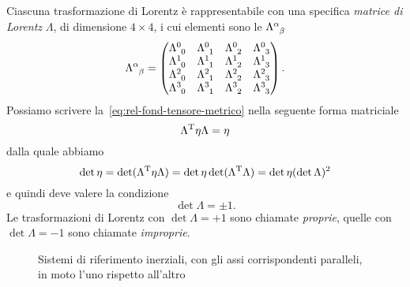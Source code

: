 Ciascuna trasformazione di Lorentz è rappresentabile con una specifica
\emph{matrice di Lorentz} $\Lambda$, di dimensione $4 \times 4$, i cui elementi
sono le $\tensor{\Lambda}{^{\alpha}_{\beta}}$
\begin{equation}
  \tensor{\Lambda}{^{\alpha}_{\beta}} =
  \begin{pmatrix}
    \tensor{\Lambda}{^{0}_{0}} & \tensor{\Lambda}{^{0}_{1}} &
    \tensor{\Lambda}{^{0}_{2}} & \tensor{\Lambda}{^{0}_{3}} \\
    \tensor{\Lambda}{^{1}_{0}} & \tensor{\Lambda}{^{1}_{1}} &
    \tensor{\Lambda}{^{1}_{2}} & \tensor{\Lambda}{^{1}_{3}} \\
    \tensor{\Lambda}{^{2}_{0}} & \tensor{\Lambda}{^{2}_{1}} &
    \tensor{\Lambda}{^{2}_{2}} & \tensor{\Lambda}{^{2}_{3}} \\
    \tensor{\Lambda}{^{3}_{0}} & \tensor{\Lambda}{^{3}_{1}} &
    \tensor{\Lambda}{^{3}_{2}} & \tensor{\Lambda}{^{3}_{3}}
  \end{pmatrix}.
\end{equation}
Possiamo scrivere la~\eqref{eq:rel-fond-tensore-metrico} nella seguente forma
matriciale
\begin{equation}
  \Lambda^{\textup{T}}\eta\Lambda = \eta
\end{equation}
dalla quale abbiamo
\begin{equation}
  \det\eta = \det(\Lambda^{\textup{T}}\eta\Lambda) = \det\eta
  \det(\Lambda^{\textup{T}}\Lambda) = \det\eta (\det\Lambda)^{2}
\end{equation}
e quindi deve valere la condizione
\begin{equation}
  \det\Lambda = \pm 1.
\end{equation}
Le trasformazioni di Lorentz con $\det\Lambda = +1$ sono chiamate
\emph{proprie}, quelle con $\det\Lambda = -1$ sono chiamate \emph{improprie}.

\begin{figure}
  \centering
  \caption[Sistemi di riferimento inerziali in moto l'uno rispetto
  all'altro]{Sistemi di riferimento inerziali, con gli assi corrispondenti
    paralleli, in moto l'uno rispetto all'altro}
  \label{fig:trasformazioni-lorentz}
\end{figure}

